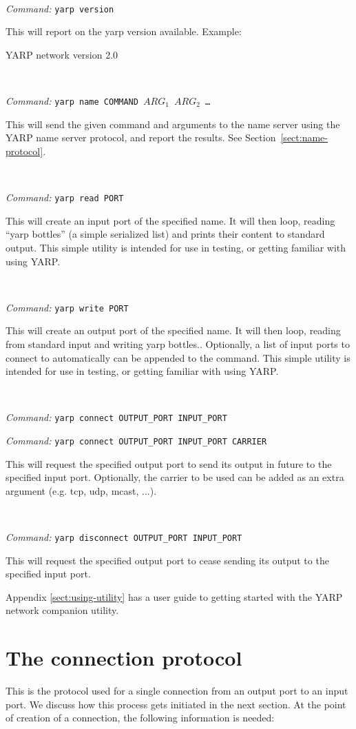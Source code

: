 \documentclass[a4]{article}
\newenvironment{packed_itemize}{
\begin{itemize}
  \renewcommand{\labelitemi}{$\triangleright$}
  \setlength{\itemsep}{1pt}
  \setlength{\parskip}{0pt}
  \setlength{\parsep}{0pt}
}{\end{itemize}}
\newcommand{\newusage}{\ \\\noindent\makebox[\textwidth]{\hrulefill}}
\newcommand{\usage}[1]{ \begin{packed_itemize} \item {\it Command:} {\tt #1} \end{packed_itemize}}
\begin{document}
\newusage{}
\usage{yarp version}
%
This will report on the yarp version available.  Example:

\begin{code}
YARP network version 2.0
\end{code}

\newusage{}
\usage{yarp name COMMAND $ARG_1$ $ARG_2$ \ldots}
%
This will send the given command and arguments to the name server
using the YARP name server protocol, and report the results.
See Section~\ref{sect:name-protocol}.
%

\newusage{}
\usage{yarp read PORT}
%
This will create an input port of the specified name.  It will
then loop, 
reading ``yarp bottles'' (a simple serialized list) and prints their content
to standard output.  This simple utility is intended for use in testing, or
getting familiar with using YARP.

\newusage{}
\usage{yarp write PORT}
%
This will create an output port of the specified name.  It will then
loop, reading from standard input and writing yarp bottles..
Optionally, a list of input ports to connect to automatically can be
appended to the command.  This simple utility is intended for use in
testing, or getting familiar with using YARP.

\newusage{}
\usage{yarp connect OUTPUT\_PORT INPUT\_PORT}
\usage{yarp connect OUTPUT\_PORT INPUT\_PORT CARRIER}
%
This will request the specified output port to send its output in 
future to the specified input port.
Optionally, the carrier to be used can be added as an extra argument
(e.g. tcp, udp, mcast, ...).

\newusage{}
\usage{yarp disconnect OUTPUT\_PORT INPUT\_PORT}
%
This will request the specified output port to cease sending its output to
the specified input port.

Appendix \ref{sect:using-utility} has a user guide to getting started
with the YARP network companion utility.


\section{The connection protocol}

This is the protocol used for a single connection from
an output port to an input port.  We discuss how this
process gets initiated in the next section.
At the point of creation of a connection, the
following information is needed:
\end{document}
